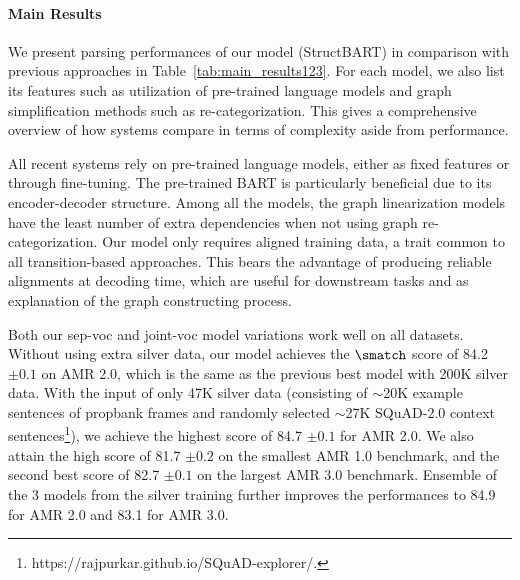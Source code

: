 




\begin{table}[!t]
    \centering
     \caption{Average action sequence length and oracle coverage on AMR 2.0 training data from different transition systems.
    Average source sentence length is 18.9.
    }
    \label{tab:oracle_actions}
\end{table}

\paragraph{Main Results}

We present parsing performances of our model (StructBART) in comparison with previous approaches in Table~\ref{tab:main_results123}. For each model, we also list its features such as utilization of pre-trained language models and graph simplification methods such as re-categorization. This gives a comprehensive overview of how systems compare in terms of complexity aside from performance.

All recent systems rely on pre-trained language models, either as fixed features or through fine-tuning. 
The pre-trained BART is particularly beneficial due to its encoder-decoder structure. 
Among all the models, the graph linearization models \citep{xu2020improving, bevilacqua2021one} have the least number of extra dependencies when not using graph re-categorization. Our model only requires aligned training data, a trait common to all transition-based approaches. This bears the advantage of producing reliable alignments at decoding time, which are useful for downstream tasks and as explanation of the graph constructing process. 



Both our sep-voc and joint-voc model variations work well on all datasets.
Without using extra silver data, our model achieves the $\smatch$ score of 84.2 {\small $\pm0.1$} on AMR 2.0, which is the same as the previous best model \citep{bevilacqua2021one} with 200K silver data. With the input of only 47K silver data (consisting of $\sim$20K example sentences of propbank frames and randomly selected $\sim$27K SQuAD-2.0 context sentences\footnote{https://rajpurkar.github.io/SQuAD-explorer/.}), we achieve the highest score of 84.7 {\small $\pm0.1$} for AMR 2.0. We also attain the high score of 81.7 {\small $\pm0.2$} on the smallest AMR 1.0 benchmark, and the second best score of 82.7 {\small $\pm0.1$} on the largest AMR 3.0 benchmark. Ensemble of the 3 models from the silver training further improves the performances to 84.9 for AMR 2.0 and 83.1 for AMR 3.0.

